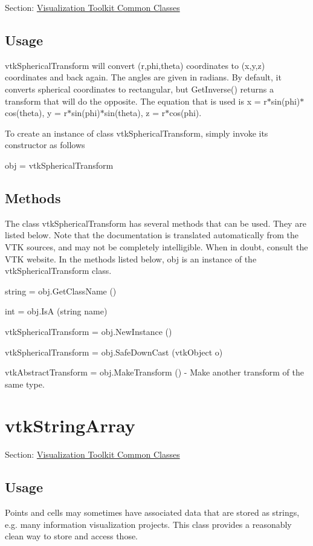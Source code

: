 Section\-: \hyperlink{sec_vtkcommon}{Visualization Toolkit Common Classes} \hypertarget{vtkwidgets_vtkxyplotwidget_Usage}{}\subsection{Usage}\label{vtkwidgets_vtkxyplotwidget_Usage}
vtk\-Spherical\-Transform will convert (r,phi,theta) coordinates to (x,y,z) coordinates and back again. The angles are given in radians. By default, it converts spherical coordinates to rectangular, but Get\-Inverse() returns a transform that will do the opposite. The equation that is used is x = r$\ast$sin(phi)$\ast$cos(theta), y = r$\ast$sin(phi)$\ast$sin(theta), z = r$\ast$cos(phi).

To create an instance of class vtk\-Spherical\-Transform, simply invoke its constructor as follows \begin{DoxyVerb}  obj = vtkSphericalTransform
\end{DoxyVerb}
 \hypertarget{vtkwidgets_vtkxyplotwidget_Methods}{}\subsection{Methods}\label{vtkwidgets_vtkxyplotwidget_Methods}
The class vtk\-Spherical\-Transform has several methods that can be used. They are listed below. Note that the documentation is translated automatically from the V\-T\-K sources, and may not be completely intelligible. When in doubt, consult the V\-T\-K website. In the methods listed below, {\ttfamily obj} is an instance of the vtk\-Spherical\-Transform class. 
\begin{DoxyItemize}
\item {\ttfamily string = obj.\-Get\-Class\-Name ()}  
\item {\ttfamily int = obj.\-Is\-A (string name)}  
\item {\ttfamily vtk\-Spherical\-Transform = obj.\-New\-Instance ()}  
\item {\ttfamily vtk\-Spherical\-Transform = obj.\-Safe\-Down\-Cast (vtk\-Object o)}  
\item {\ttfamily vtk\-Abstract\-Transform = obj.\-Make\-Transform ()} -\/ Make another transform of the same type.  
\end{DoxyItemize}\hypertarget{vtkcommon_vtkstringarray}{}\section{vtk\-String\-Array}\label{vtkcommon_vtkstringarray}
Section\-: \hyperlink{sec_vtkcommon}{Visualization Toolkit Common Classes} \hypertarget{vtkwidgets_vtkxyplotwidget_Usage}{}\subsection{Usage}\label{vtkwidgets_vtkxyplotwidget_Usage}
Points and cells may sometimes have associated data that are stored as strings, e.\-g. many information visualization projects. This class provides a reasonably clean way to store and access those.


